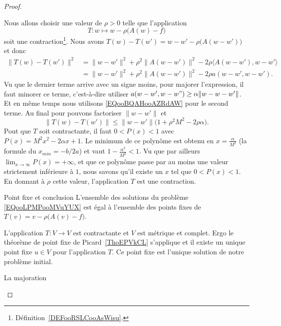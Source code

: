 \begin{proof}
\begin{subproof}
		Nous allons choisir une valeur de \( \rho>0\) telle que l'application
		\begin{equation}
			T\colon w\mapsto w-\rho\big( A(w)-f \big)
		\end{equation}
		soit une contraction\footnote{Définition~\ref{DEFooRSLCooAsWisu}.}. Nous avons \( T(w)-T(w')=w-w'-\rho\big( A(w-w') \big)\) et donc
		\begin{subequations}
			\begin{align}
				\| T(w)-T(w') \|^2 & =\| w-w' \|^2+\rho^2\| A(w-w') \|^2-2\rho\langle A(w-w'), w-w'\rangle \\
				                   & =\| w-w' \|^2+\rho^2\| A(w-w') \|^2-2\rho a(w-w',w-w').
			\end{align}
		\end{subequations}
		Vu que le dernier terme arrive avec un signe moins, pour majorer l'expression, il faut minorer ce terme, c'est-à-dire utiliser \( a(w-w',w-w")\geq \alpha\| w-w-w' \|\). Et en même temps nous utilisons \eqref{EQooBQAHooAZRdAW} pour le second terme. Au final pour pouvons factoriser \( \| w-w' \|\) et
		\begin{equation}
			\| T(w)-T(w') \|\leq \| w-w' \|\big( 1+\rho^2M^2-2\rho\alpha \big).
		\end{equation}
		Pout que \( T\) soit contractante, il faut \( 0<P(x)<1\) avec \( P(x)=M^2x^2-2\alpha x+1\). Le minimum de ce polynôme est obtenu en \( x=\frac{ \alpha }{ M^2 }\) (la formule du \( x_{min}=-b/2a\)) et vaut \( 1-\frac{ \alpha^2 }{ M^2 }<1\). Vu que par ailleurs \( \lim_{x\to \infty} P(x)=+\infty\), et que ce polynôme passe par au moins une valeur strictement inférieure à \( 1\), nous savons qu'il existe un \( x\) tel que \( 0<P(x)<1\). En donnant à \( \rho\) cette valeur, l'application \( T\) est une contraction.

		\item[Point fixe et conclusion]
		L'ensemble des solutions du problème \eqref{EQooLPMPooMVuYUX} est égal à l'ensemble des points fixes de \( T(v)=v-\rho\big( A(v)-f \big)\).

		L'application \( T\colon V\to V\) est contractante et \( V\) est métrique et complet. Ergo le théorème de point fixe de Picard~\ref{ThoEPVkCL} s'applique et il existe un unique point fixe \( u\in V\) pour l'application \( T\). Ce point fixe est l'unique solution de notre problème initial.

		\item[La majoration]


\end{subproof}
\end{proof}
